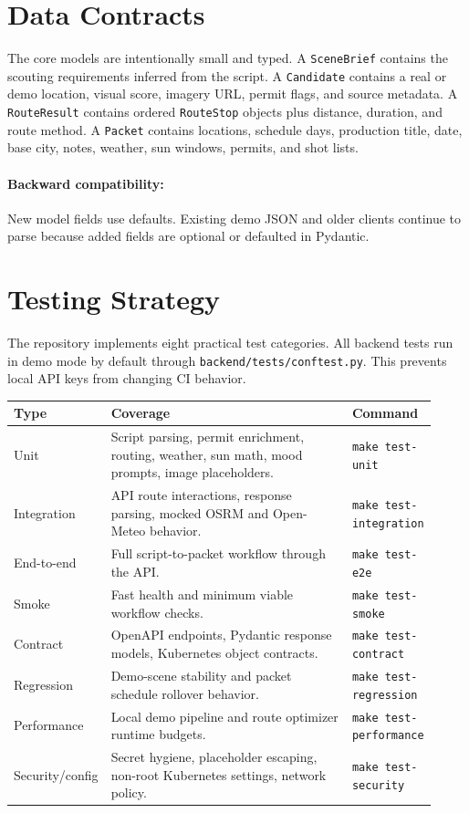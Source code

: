 \documentclass[11pt]{article}
\begin{document}
\section{Data Contracts}

The core models are intentionally small and typed. A \texttt{SceneBrief}
contains the scouting requirements inferred from the script. A \texttt{Candidate}
contains a real or demo location, visual score, imagery URL, permit flags, and
source metadata. A \texttt{RouteResult} contains ordered \texttt{RouteStop}
objects plus distance, duration, and route method. A \texttt{Packet} contains
locations, schedule days, production title, date, base city, notes, weather, sun
windows, permits, and shot lists.

\paragraph{Backward compatibility:}
New model fields use defaults. Existing demo JSON and older clients continue to
parse because added fields are optional or defaulted in Pydantic.

\section{Testing Strategy}

The repository implements eight practical test categories. All backend tests run
in demo mode by default through \texttt{backend/tests/conftest.py}. This prevents
local API keys from changing CI behavior.

\begin{longtable}{>{\raggedright\arraybackslash}p{0.18\linewidth} >{\raggedright\arraybackslash}p{0.58\linewidth} >{\raggedright\arraybackslash}p{0.16\linewidth}}
\toprule
\textbf{Type} & \textbf{Coverage} & \textbf{Command} \\
\midrule
\endhead
Unit & Script parsing, permit enrichment, routing, weather, sun math, mood prompts, image placeholders. & \texttt{make test-unit} \\
Integration & API route interactions, response parsing, mocked OSRM and Open-Meteo behavior. & \texttt{make test-integration} \\
End-to-end & Full script-to-packet workflow through the API. & \texttt{make test-e2e} \\
Smoke & Fast health and minimum viable workflow checks. & \texttt{make test-smoke} \\
Contract & OpenAPI endpoints, Pydantic response models, Kubernetes object contracts. & \texttt{make test-contract} \\
Regression & Demo-scene stability and packet schedule rollover behavior. & \texttt{make test-regression} \\
Performance & Local demo pipeline and route optimizer runtime budgets. & \texttt{make test-performance} \\
Security/config & Secret hygiene, placeholder escaping, non-root Kubernetes settings, network policy. & \texttt{make test-security} \\
\bottomrule
\end{longtable}
\end{document}
